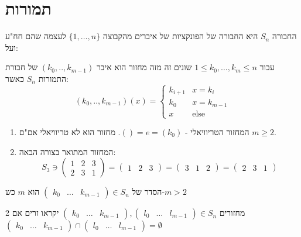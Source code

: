 \documentclass{tstextbook}
\begin{document}
\section{תמורות}

\begin{reminder}
החבורה \(S_{n}\) היא החבורה של הפונקציות של איברים מהקבוצה \(\{ 1,\dots,n \}\) לעצמה שהם חח"ע ועל:

\end{reminder}
\begin{definition}[מחזור]
עבור \(1\leq k_{0},\dots,k_{m}\leq n\) שונים זה מזה
 מחזור הוא איבר \((k_{0},..,k_{m-1})\) של חבורת התמורות \(S_{n}\) כאשר:
 $$(k_{0},..,k_{m-1})(x)=\begin{cases}k_{i+1} & x=k_{i} \\k_{0}  & x=k_{m-1} \\x & \text{else}
\end{cases}$$

\end{definition}
\begin{example}
  \begin{enumerate}
    \item המחזור הטריוויאלי - \(()=e=(k_{0})\). מחזור הוא לא טריוויאלי אם"ם \(m\geq 2\). 


    \item המחזור המתואר בצורה הבאה: 
$$S_{3}\ni\begin{pmatrix}1  & 2 & 3 \\2 & 3 & 1\end{pmatrix} = \begin{pmatrix}1 & 2 & 3\end{pmatrix}=\begin{pmatrix}3 & 1 & 2\end{pmatrix}=\begin{pmatrix}2 & 3 & 1
\end{pmatrix}$$


  \end{enumerate}
\end{example}
\begin{remark}
הסדר של \(\begin{pmatrix} k_{0}& \dots & k_{m-1}\end{pmatrix}\in S_{n}\)  הוא \(m\) כש-\(m>2\)

\end{remark}
\begin{definition}
2 מחזורים \(\begin{pmatrix} k_{0}& \dots & k_{m-1}\end{pmatrix},\begin{pmatrix} l_{0}& \dots & l_{m-1}\end{pmatrix}\in S_{n}\) יקראו זרים אם \(\begin{pmatrix} k_{0}& \dots & k_{m-1}\end{pmatrix}\cap\begin{pmatrix} l_{0}& \dots & l_{m-1}\end{pmatrix}=\emptyset\)

\end{definition}
\end{document}
